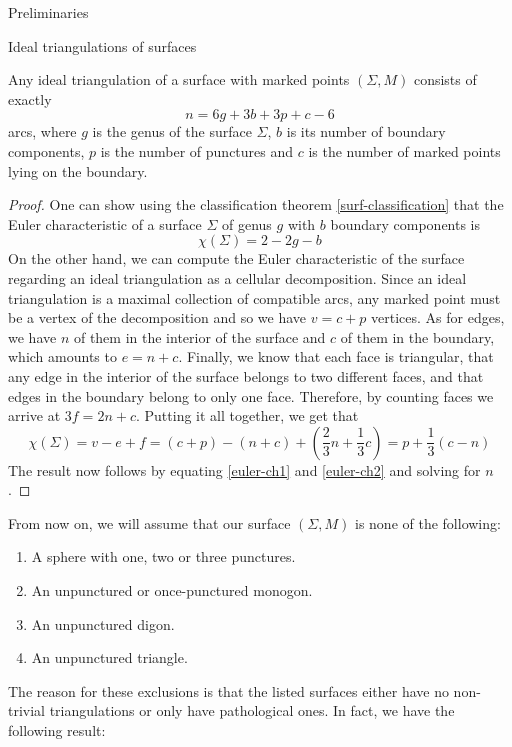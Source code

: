 \begin{chapter}{Preliminaries}
\begin{section}{Ideal triangulations of surfaces}
\begin{prop} Any ideal triangulation of a surface with marked points $(\Sigma, M)$ consists of exactly
\[
n=6g+3b+3p+c-6
\]
arcs, where $g$ is the genus of the surface $\Sigma$, $b$ is its number of boundary components, $p$ is the number of punctures and $c$ is the number of marked points lying on the boundary.
\end{prop}
\begin{proof} One can show using the classification theorem \ref{surf-classification} that the Euler characteristic of a surface $\Sigma$ of genus $g$ with $b$ boundary components is
\begin{equation}\label{euler-ch1}
\chi(\Sigma)=2-2g-b
\end{equation}
On the other hand, we can compute the Euler characteristic of the surface regarding an ideal triangulation as a cellular decomposition. Since an ideal triangulation is a maximal collection of compatible arcs, any marked point must be a vertex of the decomposition and so we have $v = c + p$ vertices. As for edges, we have $n$ of them in the interior of the surface and $c$ of them in the boundary, which amounts to $e = n + c$. Finally, we know that each face is triangular, that any edge in the interior of the surface belongs to two different faces, and that edges in the boundary belong to only one face. Therefore, by counting faces we arrive at $3f = 2n+c$. Putting it all together, we get that
\begin{equation}\label{euler-ch2}
\chi(\Sigma)=v-e+f=(c+p)-(n+c)+\left(\frac{2}{3}n+\frac{1}{3} c\right)=p+\frac{1}{3}(c-n)
\end{equation}
The result now follows by equating \eqref{euler-ch1} and \eqref{euler-ch2} and solving for $n$.
\end{proof}

From now on, we will assume that our surface $(\Sigma, M)$ is none of the following:
\begin{enumerate}
\item A sphere with one, two or three punctures.
\item An unpunctured or once-punctured monogon.
\item An unpunctured digon.
\item An unpunctured triangle.
\end{enumerate}
The reason for these exclusions is that the listed surfaces either have no non-trivial triangulations or only have pathological ones. In fact, we have the following result:


\end{section}
\end{chapter}
